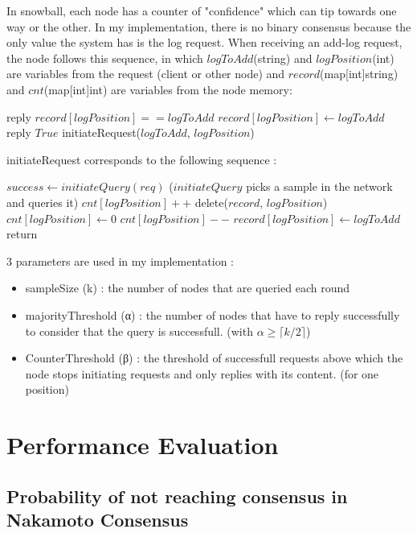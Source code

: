 \documentclass[11pt, twocolumn]{article}
\begin{document}
In snowball, each node has a counter of "confidence" which can tip towards one way or the other. In my implementation, there is no binary consensus because the only value the system has is the log request.
When receiving an add-log request, the node follows this sequence, in which $logToAdd$(string) and $logPosition$(int) are variables from the request (client or other node) and $record$(map[int]string) and $cnt$(map[int]int) are variables from the node memory:
\begin{algorithmic}
    \State reply $record[logPosition] == logToAdd$
    \Else
    \State $record[logPosition] \gets logToAdd$
    \State reply $True$
    \State initiateRequest($logToAdd$, $logPosition$)
    \EndIf
\end{algorithmic}

initiateRequest corresponds to the following sequence :

\begin{algorithmic}
    \State $success \gets initiateQuery(req)$
    \State ($initiateQuery$ picks a sample in the network and queries it)
    \State $cnt[logPosition]++$
    \Else
    \State delete($record$, $logPosition$)
    \State $cnt[logPosition] \gets 0$
    \Else
    \State $cnt[logPosition]--$
    \EndIf
    \EndIf
    \State $record[logPosition] \gets logToAdd$
    \State return
    \EndIf
    \EndWhile
\end{algorithmic}

3 parameters are used in my implementation :
\begin{itemize}
    \item sampleSize (k) : the number of nodes that are queried each round
    \item majorityThreshold (α) : the number of nodes that have to reply successfully to consider that the query is successfull.
          (with $\alpha \geq \lceil k/2 \rceil$)
    \item CounterThreshold (β) : the threshold of successfull requests above which the node stops initiating requests and only replies with its content. (for one position)
\end{itemize}

\section{Performance Evaluation}
\subsection{Probability of not reaching consensus in Nakamoto Consensus}
\end{document}
